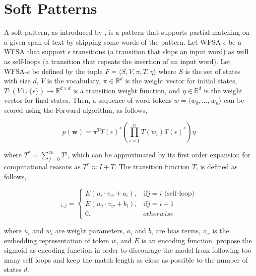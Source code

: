 \documentclass[11pt,a4paper]{article}
\begin{document}

\section{Soft Patterns}

A soft pattern, as introduced by \citet{davidov2010enhanced}, is a pattern that supports partial matching on a given span of text by skipping some words of the pattern.
Let WFSA-$\epsilon$ be a WFSA that support $\epsilon$ transitions (a transition that skips an input word) as well as self-loops (a transition that repeats the insertion of an input word).
Let WFSA-$\epsilon$ be defined by the tuple $F = \langle S,V,\pi, T, \eta \rangle$ where $S$ is the set of states with size $d$, $V$ is the vocabulary, $ \pi \in \mathbb{R}^d $ is the weight vector for initial states, $T: (V \cup \{\epsilon\} ) \to \mathbb{R}^{d \times d}$ is a transition weight function, and $\eta \in \mathbb{R}^d$ is the weight vector for final states.
Then, a sequence of word tokens $w=\langle w_0,...,w_n \rangle$ can be scored using the Forward algorithm, as follows,

\begin{equation}
p(\mathbf{w}) = \pi^T T(\epsilon)^{\ast}  \left( \prod_{i=1}^{n} T(w_i) T(\epsilon)^\ast  \right) \eta
\end{equation}

where $T^* = \sum_{j=0}^\infty T^j$, which can be approximated by its first order expansion for computational reasons \cite{schwartz2018sopa} as $T^* \approx I + T$.
The transition function $T$, is defined as follows,

\begin{equation}
[T(w)]_{i,j} = 
\left \{
	\begin{array}{ll}
		E(u_i \cdot v_w + a_i), & \mbox{if} j=i \mbox{ (self-loop)} \\
		E(w_i \cdot v_w + b_i), & \mbox{if} j=i+1 \\
		0, & otherwise
	\end{array}
\right .
\end{equation}

where $u_i$ and $w_i$ are weight parameters, $a_i$ and $b_i$ are bias terms, $v_w$ is the embedding representation of token $w$, and $E$ is an encoding function. \citet{schwartz2018sopa} propose the sigmoid as encoding function in order to discourage the model from following too many self loops and keep the match length as close as possible to the number of states $d$.
\end{document}
